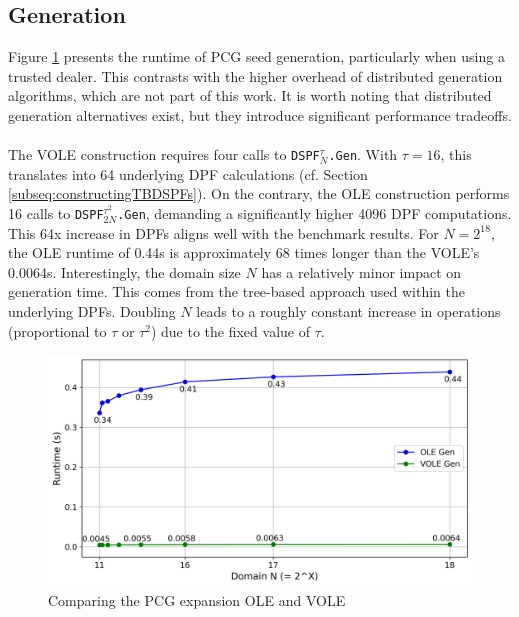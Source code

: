 \subsection{Generation}
\label{subsec:evalGen}
Figure \ref{fig:ComparingPCGGeneration} presents the runtime of PCG seed generation, particularly when using a trusted dealer. This contrasts with the higher overhead of distributed generation algorithms, which are not part of this work. It is worth noting that distributed generation alternatives exist, but they introduce significant performance tradeoffs.
\\\\
The VOLE construction requires four calls to \texttt{DSPF$^{\tau}_{N}$.Gen}. With $\tau=16$, this translates into 64 underlying DPF calculations (cf. Section \ref{subseq:constructingTBDSPFs}). On the contrary, the OLE construction performs 16 calls to \texttt{DSPF$^{\tau^2}_{2N}$.Gen}, demanding a significantly higher 4096 DPF computations. This 64x increase in DPFs aligns well with the benchmark results. For $N=2^{18}$, the OLE runtime of 0.44s is approximately 68 times longer than the VOLE's 0.0064s. Interestingly, the domain size $N$ has a relatively minor impact on generation time. This comes from the tree-based approach used within the underlying DPFs. Doubling $N$ leads to a roughly constant increase in operations (proportional to $\tau$ or $\tau^2$) due to the fixed value of $\tau$. 

\begin{figure}[t]
    \centering
    \includegraphics[scale=0.49]{images/plots/pcg_gen.png}
    \caption{Comparing the PCG expansion OLE and VOLE}
    \label{fig:ComparingPCGGeneration}
\end{figure}

